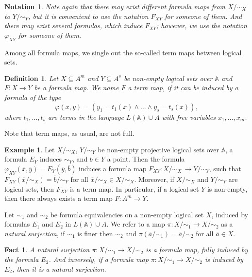 \documentclass[12pt]{article}
\newtheorem{fact}{Fact}
\newtheorem{notation}{Notation}
\newtheorem{definition}{Definition}
\theoremstyle{definition}
\newtheorem{example}{Example}
\def\MA{{\mathbb{A}}}
\begin{document}
\begin{notation}
Note again that there may exist different formula maps from $X/{\sim_X}$ to $Y/{\sim_Y}$, but it is convenient to use the notation $F_{XY}$ for someone of them. And there may exist several formulas, which induce $F_{XY}$; however, we use the notation $\varphi_{XY}$ for someone of them.   
\end{notation}


Among all formula maps, we single out the so-called term maps between logical sets. 

\begin{definition}
Let $X\subseteq A^m$ and $Y\subseteq A^s$ be non-empty logical sets over $\MA$ and $F\colon X \to Y$ be a formula map. 
We name $F$ a {\em term map}, if it can be induced by a formula of the type
$$
\varphi(\bar x, \bar y)=(y_1=t_1(\bar x)\wedge\ldots\wedge y_s=t_s(\bar x)),
$$
where $t_1,\ldots,t_s$ are terms in the language $L(\MA)\cup A$ with free variables $x_1,\ldots,x_m$.
\end{definition}

Note that term maps, as usual, are not full.

\begin{example}\label{ex:non-empty1}
    Let $X/{\sim_X}$, $Y/{\sim_Y}$ be non-empty projective logical sets over $\MA$, a formula $E_Y$ induces $\sim_Y$, and $\bar b\in Y$ a point. Then the formula $\varphi_{XY}(\bar x, \bar y)=E_Y(\bar y,\bar b)$ induces a formula map $F_{XY}\colon X/{\sim_X}\,\to Y/{\sim_Y}$, such that $F_{XY}(\bar x/{\sim_X})=\bar b/{\sim_Y}$ for all $\bar x/{\sim_X}\in X/{\sim_X}$. Moreover, if $X/{\sim_X}$ and $Y/{\sim_Y}$ are logical sets, then $F_{XY}$ is a term map. In particular, if a logical set $Y$ is non-empty, then there always exists a term map $F\colon A^m\to Y$.
\end{example}

Let $\sim_1$ and $\sim_2$ be formula equivalencies on a non-empty logical set $X$, induced by formulas $E_1$ and $E_2$ in $L(\MA)\cup A$. We refer to a map $\pi\colon X/{\sim_1}\to X/{\sim_2}$ as a {\em natural surjection}, if $\sim_1$ is finer then $\sim_2$ and $\pi(\bar a/{\sim_1})=\bar a/{\sim_2}$ for all $\bar a\in X$.

\begin{fact}\label{fact:surjection}
A natural surjection $\pi\colon X/{\sim_1}\to X/{\sim_2}$ is a formula map, fully induced by the formula $E_2$. And inversely, if a formula map $\pi\colon X/{\sim_1}\to X/{\sim_2}$ is induced by $E_2$, then it is a natural surjection.
\end{fact}
\end{document}
